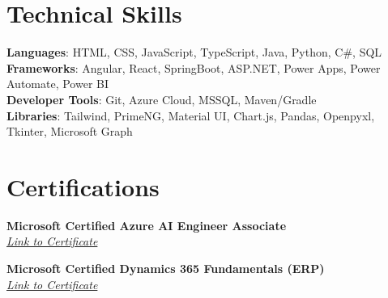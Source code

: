\documentclass[letterpaper,11pt]{article}
\begin{document}
\section{Technical Skills}
 \begin{itemize}[leftmargin=0.15in, label={}]
    \small{\item{
     \textbf{Languages}{: HTML, CSS, JavaScript, TypeScript, Java, Python, C\#, SQL} \\
     \textbf{Frameworks}{: Angular, React, SpringBoot, ASP.NET, Power Apps, Power Automate, Power BI} \\
     \textbf{Developer Tools}{: Git, Azure Cloud, MSSQL, Maven/Gradle} \\
     \textbf{Libraries}{: Tailwind, PrimeNG, Material UI, Chart.js, Pandas, Openpyxl, Tkinter, Microsoft Graph}
    }}
 \end{itemize}

\section{Certifications}
  \begin{itemize}[leftmargin=0.15in, label={}]
    \small{\item{
     \textbf{Microsoft Certified Azure AI Engineer Associate} \\
     \textit{\href{https://learn.microsoft.com/en-us/users/zichengli-4388/credentials/8f80de9e7944a10}{Link to Certificate}} \\
    }}
    \small{\item{
     \textbf{Microsoft Certified Dynamics 365 Fundamentals (ERP)} \\
    \textit{\href{https://learn.microsoft.com/en-us/users/zichengli-4388/credentials/5d28421aefedb4ec}{Link to Certificate}}
    }}
 \end{itemize}


\end{document}
